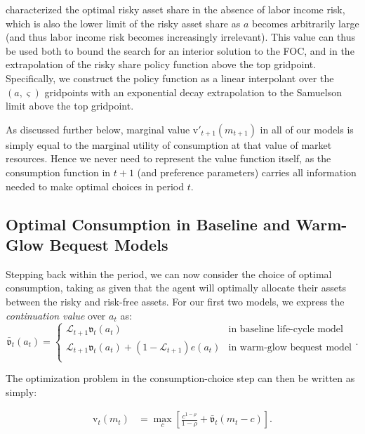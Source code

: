 \documentclass[12pt,letterpaper, fleqn]{article}
\newcommand{\CRRA}{\rho}
\newcommand{\vFunc}{\mathrm{v}}
\newcommand{\Alive}{\mathcal{L}}
\newcommand{\cNrm}{c}
\newcommand{\mNrm}{m}
\newcommand{\aNrm}{a}
\begin{document}
\cite{Samuelson1969} characterized the optimal risky asset share in the absence of labor income risk, which is also the lower limit of the risky asset share as $\aNrm$ becomes arbitrarily large (and thus labor income risk becomes increasingly irrelevant). This value can thus be used both to bound the search for an interior solution to the FOC, and in the extrapolation of the risky share policy function above the top gridpoint. Specifically, we construct the policy function as a linear interpolant over the $(\aNrm, \varsigma)$ gridpoints with an exponential decay extrapolation to the Samuelson limit above the top gridpoint.

As discussed further below, marginal value $\vFunc'_{t+1}(\mNrm_{t+1})$ in all of our models is simply equal to the marginal utility of consumption at that value of market resources. Hence we never need to represent the value function itself, as the consumption function in $t+1$ (and preference parameters) carries all information needed to make optimal choices in period $t$.

\subsection{Optimal Consumption in Baseline and Warm-Glow Bequest Models}

Stepping back within the period, we can now consider the choice of optimal consumption, taking as given that the agent will optimally allocate their assets between the risky and risk-free assets. For our first two models, we express the \textit{continuation value} over $\aNrm_t$ as:
\begin{equation}
\bar{\mathfrak{v}}_t(\aNrm_t) = \begin{cases}
\Alive_{t+1} \mathfrak{v}_t(\aNrm_t) & \text{in baseline life-cycle model} \\
\Alive_{t+1} \mathfrak{v}_t(\aNrm_t) + (1 - \Alive_{t+1})e(\aNrm_t) & \text{in warm-glow bequest model} \\
\end{cases}.
\end{equation}

The optimization problem in the consumption-choice step can then be written as simply:

\begin{align}
\vFunc_t(\mNrm_t) &= \max_{\cNrm} \left[ \frac{\cNrm^{1-\CRRA}}{1 - \CRRA} + \bar{\mathfrak{v}}_t(\mNrm_t - \cNrm) \right].
\end{align}
\end{document}
